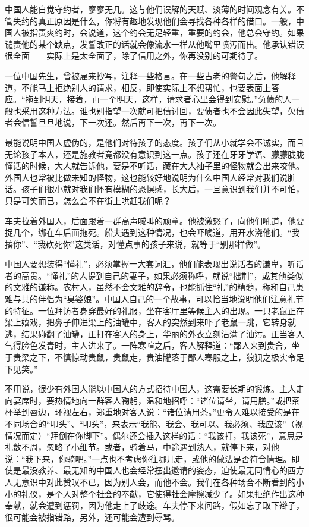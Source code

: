 \documentclass[12pt,oneside]{book}
\begin{document}
\begin{common-format}
中国人能自觉守约者，寥寥无几。这与他们误解的天赋、淡薄的时间观念有关。不管失约的真正原因是什么，你将有趣地发现他们会寻找各种各样的借口。一般，中国人被指责爽约时，会说道，这个约会无足轻重，重要的约会，他总会守约。如果谴责他的某个缺点，发誓改正的话就会像流水一样从他嘴里喷泻而出。他承认错误很全面——实际上是太全面了，除了信用之外，你再没别的可期待了。 

一位中国先生，曾被雇来抄写，注释一些格言。在一些古老的警句之后，他解释道，不能马上拒绝别人的请求，相反，即使实际上不想帮忙，也要表面上答应。“拖到明天，接着，再一个明天，这样，请求者心里会得到安慰。”负债的人一般也采用这种方法。谁也别指望一次就可把债讨回，要债者也不会因此失望，欠债者会信誓旦旦地说，下一次还。然后再下一次，再下一次。 

最能说明中国人虚伪的，是他们对待孩子的态度。孩子们从小就学会不诚实，而且无论孩子本人，还是施教者竟都没有意识到这一点。孩子还在牙牙学语、朦朦胧胧懂话的时候，大人就告诉他，要是不听话，藏在大人袖子里的怪物就会出来咬他。外国人也常被比做未知的怪物，这也能较好地说明为什么中国人经常对我们说脏话。孩子们很小就对我们怀有模糊的恐惧感，长大后，一旦意识到我们并不可怕，只是可笑而已，怎么会不在街上哄赶我们呢？ 

车夫拉着外国人，后面跟着一群高声喊叫的顽童。他被激怒了，向他们吼道，他要捉几个，绑在车后面拖死。船夫遇到这种情况，也会吓唬道，用开水浇他们。“我揍你”、“我砍死你”这类话，对懂点事的孩子来说，就等于“别那样做”。 

中国人要想装得“懂礼”，必须掌握一大套词汇，他们能表现出说话者的谦卑，听话者的高贵。“懂礼”的人提到自己的妻子，如果必须称呼，就说“拙荆”，或其他类似的文雅的谦称。农村人，虽然不会文雅的辞令，也能抓住“礼”的精髓，称和自己患难与共的伴侣为“臭婆娘”。中国人自己的一个故事，可以恰当地说明他们注意礼节的特征。一位拜访者身穿最好的礼服，坐在客厅里等候主人的出现。一只老鼠正在梁上嬉戏，把鼻子伸进梁上的油罐中，客人的突然到来吓了老鼠一跳，它转身就逃，结果碰翻了油罐，正打在客人的身上，华丽的外衣立刻沾满了油污。正当客人气得脸色发青时，主人进来了。一阵寒喧之后，客人解释道：“鄙人来到贵舍，坐于贵梁之下，不慎惊动贵鼠，贵鼠走，贵油罐落于鄙人寒服之上，狼狈之极实令足下见笑。” 

不用说，很少有外国人能以中国人的方式招待中国人，这需要长期的锻炼。主人走向宴席时，要热情地向一群客人鞠躬，温和地招呼：“诸位请坐，请用膳。”或把茶杯举到唇边，环视左右，郑重地对客人说：“诸位请用茶。”更令人难以接受的是在不同场合的“叩头”、“叩头”，来表示“我能、我会、我可以、我必须、我应该”（视情况而定）“拜倒在你脚下”。偶尔还会插入这样的话：“我该打，我该死”，意思是礼数不周，忽略了小细节。或者，骑着马，中途遇到熟人，就停下来，对他说：“我下来，你骑吧。”一点也不考虑你往哪儿走，或他的做法是否符合情理。即使是最没教养、最无知的中国人也会经常摆出邀请的姿态，迫使最无同情心的西方人无意识中对此赞叹不已，因为别人会，而他不会。我们在各种场合不断看到的小小的礼仪，是个人对整个社会的奉献，它使得社会摩擦减少了。如果拒绝作出这种奉献，就会遭到惩罚，因为他走上了歧途。车夫停下来问路，假如忘了取下辫子，很可能会被指错路，另外，还可能会遭到辱骂。 


\end{common-format}
\end{document}
